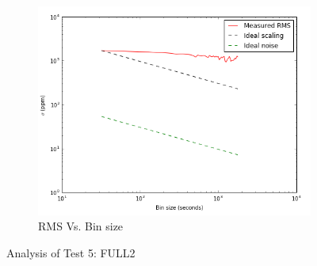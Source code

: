 \documentclass{aastex6}
\begin{document}
\begin{figure}[H]
    \begin{subfigure}{3}
        \includegraphics[scale=0.6]{rms_test5}
        \caption{RMS Vs. Bin size}
    \end{subfigure}
    \caption{Analysis of Test 5: FULL2}
\end{figure}
\end{document}
